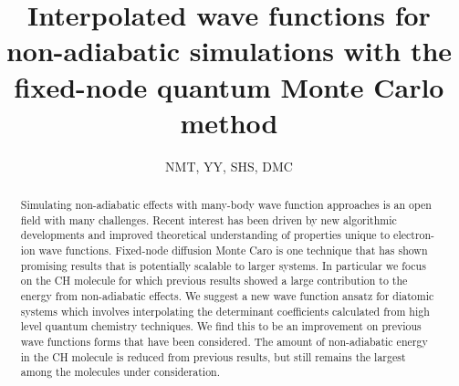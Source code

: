 \documentclass[aip,jcp,numerical,reprint]{revtex4-1}
\begin{document}
\title{Interpolated wave functions for non-adiabatic simulations with the fixed-node quantum Monte Carlo method}
\author{NMT, YY, SHS, DMC}

\begin{abstract}
Simulating non-adiabatic effects with many-body wave function approaches is an open field with many challenges.  %
Recent interest has been driven by new algorithmic developments and improved theoretical understanding of properties unique to electron-ion wave functions.  Fixed-node diffusion Monte Caro is one technique that has shown promising results that is potentially scalable to larger systems.
In particular we focus on the CH molecule for which previous results showed a large contribution to the energy from non-adiabatic effects.  We suggest a new wave function ansatz for diatomic systems which involves interpolating the determinant coefficients calculated from high level quantum chemistry techniques.    We find this to be an improvement on previous wave functions forms that have been considered.    The amount of non-adiabatic energy in the CH molecule is reduced from previous results, but still remains the largest among the molecules under consideration.

\end{abstract}
\maketitle
\end{document}
